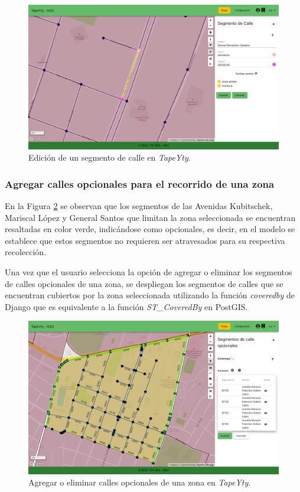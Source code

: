 \begin{figure}[H]
\centerline{\includegraphics[width=\textwidth]{edicionCalle.png}}
\caption{Edición de un segmento de calle en \textit{TapeYty}.}
\label{fig:edicionCalles}
\end{figure}

\subsubsection{Agregar calles opcionales para el recorrido de una zona}

En la Figura \ref{fig:callesOpcionales} se observan que los segmentos de las Avenidas Kubitschek, Mariscal López y General Santos que limitan la zona seleccionada se encuentran resaltadas en color verde, indicándose como opcionales, es decir, en el modelo se establece que estos segmentos no requieren ser atravesados para su respectiva recolección.

Una vez que el usuario selecciona la opción de agregar o eliminar los segmentos de calles opcionales de una zona, se despliegan los segmentos de calles que se encuentran cubiertos por la zona seleccionada utilizando la función \textit{coveredby} de Django que es equivalente a la función \textit{ST\_CoveredBy} en PostGIS.

\begin{figure}[H]
\centerline{\includegraphics[width=\textwidth]{callesOpcionales.png}}
\caption{Agregar o eliminar calles opcionales de una zona en \textit{TapeYty}.}
\label{fig:callesOpcionales}
\end{figure}

